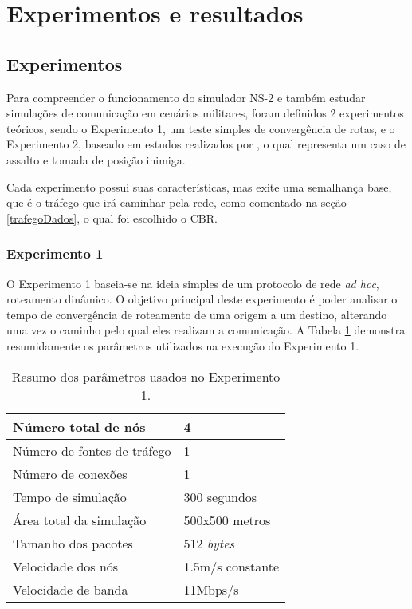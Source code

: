\section{Experimentos e resultados}\label{experimentos}
\subsection{Experimentos}
Para compreender o funcionamento do simulador NS-2 e tamb\'em estudar simula\c{c}\~oes de comunica\c{c}\~ao em cen\'arios militares, foram definidos 2 experimentos te\'oricos, sendo o Experimento 1, um teste simples de converg\^encia de rotas, e o Experimento 2, baseado em estudos realizados por \cite{pereira}, o qual representa um caso de assalto e tomada de posi\c{c}\~ao inimiga.

Cada experimento possui suas caracter\'isticas, mas exite uma semalhan\c{c}a base, que \'e o tr\'afego que ir\'a caminhar pela rede, como comentado na se\c{c}\~ao \ref{trafegoDados}, o qual foi escolhido o CBR.

\subsubsection{Experimento 1}
O Experimento 1 baseia-se na ideia simples de um protocolo de rede \textit{ad hoc}, roteamento din\^amico.
O objetivo principal deste experimento \'e poder analisar o tempo de converg\^encia de roteamento de uma origem a um destino, alterando uma vez o caminho pelo qual eles realizam a comunica\c{c}\~ao.
A Tabela \ref{tabParamExp1} demonstra resumidamente os par\^ametros utilizados na execu\c{c}\~ao do Experimento 1.

\begin{table}[H]
	\centering
	\caption{Resumo dos par\^ametros usados no Experimento 1.}
	\begin{tabular}{ | l | l | }
		\hline
		N\'umero total de n\'os & 4 \\ \hline
		N\'umero de fontes de tr\'afego & 1 \\ \hline
		N\'umero de conex\~oes & 1 \\ \hline
		Tempo de simula\c{c}\~ao & 300 segundos \\ \hline
		\'Area total da simula\c{c}\~ao & 500x500 metros \\ \hline
		Tamanho dos pacotes & 512 \textit{bytes} \\ \hline	
		Velocidade dos n\'os & 1.5m/s constante \\ \hline
		Velocidade de banda & 11Mbps/s \\ \hline
	\end{tabular}
	\label{tabParamExp1}
\end{table}

